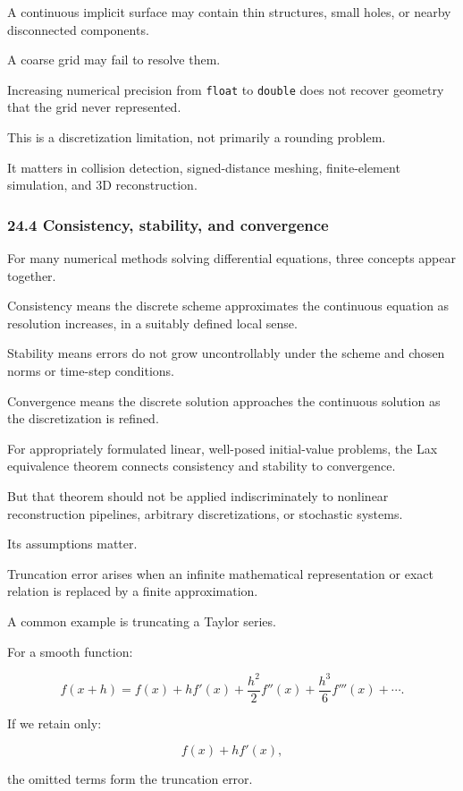 A continuous implicit surface may contain thin structures, small holes, or nearby disconnected components.

A coarse grid may fail to resolve them.

Increasing numerical precision from \texttt{float} to \texttt{double} does not recover geometry that the grid never represented.

This is a discretization limitation, not primarily a rounding problem.

It matters in collision detection, signed-distance meshing, finite-element simulation, and 3D reconstruction.

\subsubsection{24.4 Consistency, stability, and convergence}\label{consistency-stability-and-convergence}

For many numerical methods solving differential equations, three concepts appear together.

Consistency means the discrete scheme approximates the continuous equation as resolution increases, in a suitably defined local sense.

Stability means errors do not grow uncontrollably under the scheme and chosen norms or time-step conditions.

Convergence means the discrete solution approaches the continuous solution as the discretization is refined.

For appropriately formulated linear, well-posed initial-value problems, the Lax equivalence theorem connects consistency and stability to convergence.

But that theorem should not be applied indiscriminately to nonlinear reconstruction pipelines, arbitrary discretizations, or stochastic systems.

Its assumptions matter.

Truncation error arises when an infinite mathematical representation or exact relation is replaced by a finite approximation.

A common example is truncating a Taylor series.

For a smooth function:

\[ f(x+h) = f(x)+hf'(x)+\frac{h^2}{2}f''(x) +\frac{h^3}{6}f'''(x)+\cdots. \]

If we retain only:

\[ f(x)+hf'(x), \]

the omitted terms form the truncation error.


